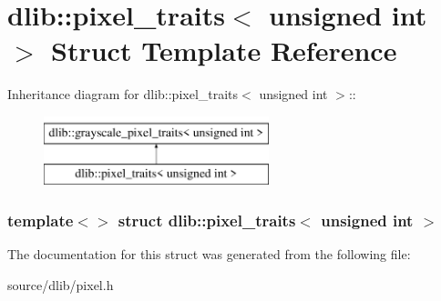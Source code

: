 \hypertarget{structdlib_1_1pixel__traits_3_01unsigned_01int_01_4}{
\section{dlib::pixel\_\-traits$<$ unsigned int $>$ Struct Template Reference}
\label{structdlib_1_1pixel__traits_3_01unsigned_01int_01_4}
}
Inheritance diagram for dlib::pixel\_\-traits$<$ unsigned int $>$::\begin{figure}[H]
\begin{center}
\leavevmode
\includegraphics[height=2cm]{structdlib_1_1pixel__traits_3_01unsigned_01int_01_4}
\end{center}
\end{figure}
\subsubsection*{template$<$$>$ struct dlib::pixel\_\-traits$<$ unsigned int $>$}



The documentation for this struct was generated from the following file:\begin{DoxyCompactItemize}
\item 
source/dlib/pixel.h\end{DoxyCompactItemize}
